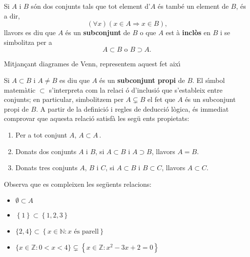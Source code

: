 \bigskip

Si $A$ i $B$ s\'{o}n dos conjunts tals que tot element d'$A$ \'{e}s tamb\'{e}
un element de $B$, \'{e}s a dir,
\begin{equation*}
\left( \forall x\right) \left( x\in A\Longrightarrow x\in B\right) \text{,}
\end{equation*}
llavors es diu que $A$ \'{e}s un \textbf{subconjunt} de $B$ o que $A$ est%
\`{a} \textbf{incl\`{o}s} en $B$ i se simbolitza per a%
\begin{equation*}
A\subset B\text{ \ \ \ \ o \ \ \ }B\supset A\text{.}
\end{equation*}

Mitjan\c{c}ant diagrames de Venn, representem aquest fet aix\'{\i}

Si $A\subset B$ i $A\neq B$ es diu que $A$ \'{e}s un \textbf{subconjunt propi%
} de $B$. El s\'{\i}mbol matem\`{a}tic $\subset$ s'interpreta com la relaci%
\'{o} d'inclusi\'{o} que s'estableix entre conjunts; en particular,
simbolitzem per $A\varsubsetneq B$ el fet que $A$ \'{e}s un subconjunt propi
de $B$. A partir de la definici\'{o} i regles de deducci\'{o} l\`{o}gica,
\'{e}s immediat comprovar que aquesta relaci\'{o} satisf\`{a} les seg\"{u}%
ents propietats:

\begin{enumerate}
\item Per a tot conjunt $A$, $A\subset A\,$.

\item Donats dos conjunts $A$ i $B$, si $A\subset B$ i $A\supset B$, llavors
$A=B$.

\item Donats tres conjunts $A$, $B$ i $C$, si $A\subset B$ i $B\subset C$,
llavors $A\subset C$.
\end{enumerate}

\bigskip

\begin{exem}
Observa que es compleixen les seg\"{u}ents relacions:

\begin{itemize}
\item $\emptyset\subset A$

\item $\left\{ 1\right\} \subset\left\{ 1,2,3\right\} $

\item $\{2,4\}\subset\left\{ x\in\mathbb{N}:x\text{ \'{e}s parell}\right\} $

\item $\{x\in\mathbb{Z}:0<x<4\}\varsubsetneq\left\{ x\in\mathbb{Z}%
:x^{2}-3x+2=0\right\} $
\end{itemize}
\end{exem}


